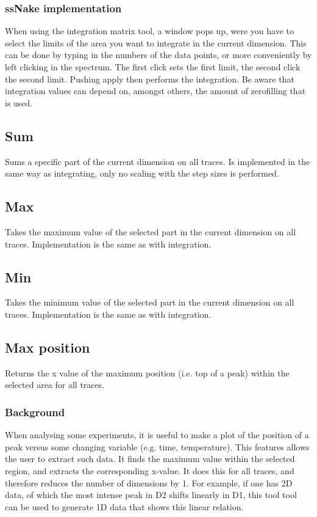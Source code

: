 \documentclass[11pt,a4paper]{article}
\begin{document}
\subsubsection*{ssNake implementation}
When using the integration matrix tool, a window pops up, were you have to select the limits of the area you want to integrate in the current dimension. This can be done by typing in the numbers of the data points, or more conveniently by left clicking in the spectrum. The first click sets the first limit, the second click the second limit. Pushing apply then performs the integration. Be aware that integration values can depend on, amongst others, the amount of zerofilling that is used.

\subsection{Sum}
Sums a specific part of the current dimension on all traces. Is implemented in the same way as integrating, only no scaling with the step sizes is performed.

\subsection{Max}
Takes the maximum value of the selected part in the current dimension on all traces. Implementation is the same as with integration.

\subsection{Min}
Takes the minimum value of the selected part in the current dimension on all traces. Implementation is the same as with integration.

\subsection{Max position}
Returns the x value of the maximum position (i.e. top of a peak) within the selected area for all traces.

\subsubsection*{Background}
When analysing some experiments, it is useful to make a plot of the position of a peak versus some changing variable (e.g. time, temperature). This features allows the user to extract such data. It finds the maximum value within the selected region, and extracts the corresponding x-value. It does this for all traces, and therefore reduces the number of dimensions by 1. For example, if one has 2D data, of which the most intense peak in D2 shifts linearly in D1, this tool tool can be used to generate 1D data that shows this linear relation.
\end{document}
